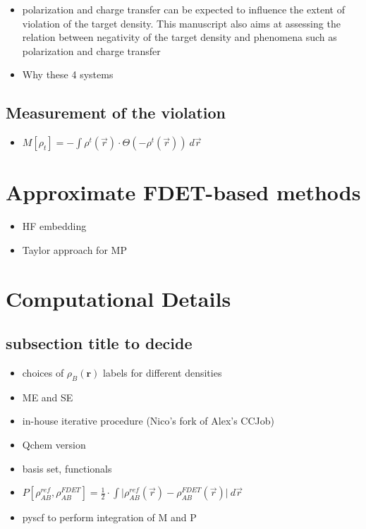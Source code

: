 \documentclass[journal=jctcce,manuscript=article, layout=onecolumn]{achemso}
\begin{document}
\begin{itemize}
 \item polarization and charge transfer can be expected to influence the extent of violation of the target density. This manuscript also aims at assessing the relation between negativity of the target density and phenomena such as polarization and charge transfer
 \item Why these 4 systems
\end{itemize}

\subsection{Measurement of the violation}
\begin{itemize}
  \item $ M[\rho_{t}] = -\int \rho^{t}(\vec{r})\cdot \Theta(-\rho^{t}(\vec{r})) \ d\vec{r}$
 \end{itemize}

\section{Approximate FDET-based methods}
\begin{itemize}
 \item HF embedding
 \item Taylor approach for MP
\end{itemize}

 \section{Computational Details}
\subsection{subsection title to decide}
\begin{itemize}
 \item choices of $\rho_B(\mathbf{r})$ labels for different densities
 \item ME and SE
 \item in-house iterative procedure (Nico's fork of Alex's CCJob)
 \item Qchem version
 \item basis set, functionals
 \item $ P[\rho_{AB}^{ref}, \rho_{AB}^{FDET}] = \frac{1}{2} \cdot \int \lvert \rho_{AB}^{ref}(\vec{r}) - \rho_{AB}^{FDET}(\vec{r}) \rvert \ d\vec{r}$
 \item pyscf to perform integration of M and P
\end{itemize}
\end{document}
